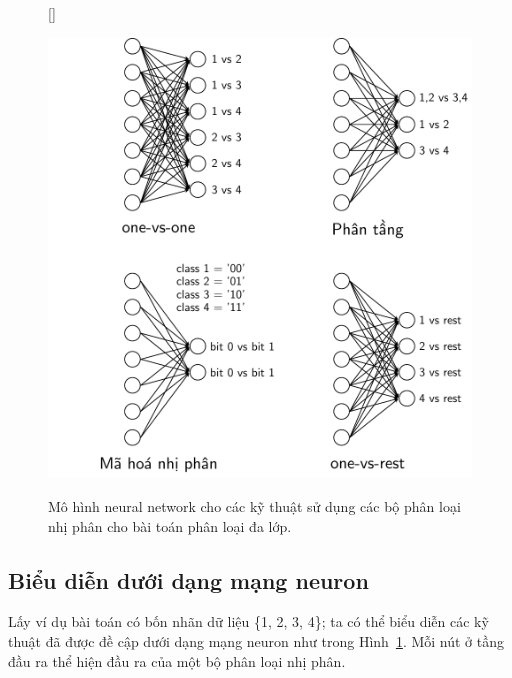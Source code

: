 \begin{figure}[t]
    [\FBwidth]
    {\caption{ 
    Mô hình neural network cho các kỹ thuật sử dụng các bộ phân loại nhị phân
    cho bài toán phân loại đa lớp.
    }
    \label{fig:12_6}}
    { %
    \includegraphics[width=.63\textwidth]{Chapters/05_NeuralNetworks/12_binaryclassifiers/latex/binaryclassifiers.pdf}
    }
\end{figure}
\subsection{Biểu diễn dưới dạng mạng neuron}
Lấy ví dụ bài toán có bốn nhãn dữ liệu \{1, 2, 3, 4\}; ta có thể biểu diễn các kỹ
thuật đã được đề cập dưới dạng mạng neuron như trong Hình~\ref{fig:12_6}. Mỗi nút ở tầng đầu ra thể hiện đầu ra của một bộ phân loại nhị phân.

